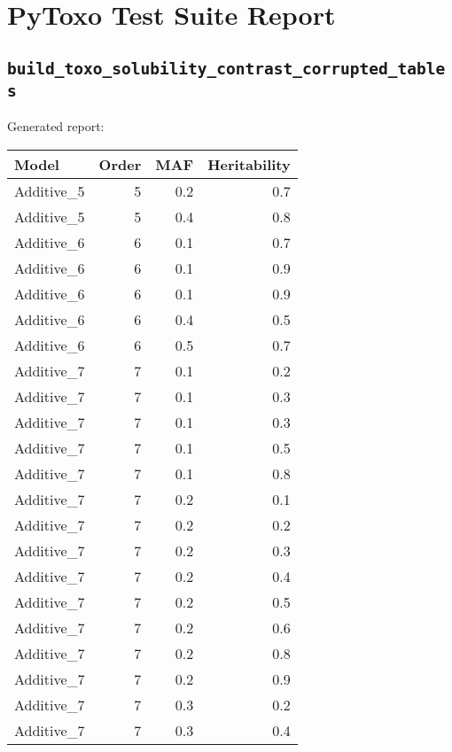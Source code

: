\documentclass{article}
\begin{document}
\section*{PyToxo Test Suite Report}
\subsection*{\texttt{build\_toxo\_solubility\_contrast\_corrupted\_tables}}
Generated report:

\begin{longtable}[H]{lrrr}
\hline
 Model      &   Order &   MAF &   Heritability \\
\hline
 Additive\_5 &       5 &   0.2 &            0.7 \\
 Additive\_5 &       5 &   0.4 &            0.8 \\
 Additive\_6 &       6 &   0.1 &            0.7 \\
 Additive\_6 &       6 &   0.1 &            0.9 \\
 Additive\_6 &       6 &   0.1 &            0.9 \\
 Additive\_6 &       6 &   0.4 &            0.5 \\
 Additive\_6 &       6 &   0.5 &            0.7 \\
 Additive\_7 &       7 &   0.1 &            0.2 \\
 Additive\_7 &       7 &   0.1 &            0.3 \\
 Additive\_7 &       7 &   0.1 &            0.3 \\
 Additive\_7 &       7 &   0.1 &            0.5 \\
 Additive\_7 &       7 &   0.1 &            0.8 \\
 Additive\_7 &       7 &   0.2 &            0.1 \\
 Additive\_7 &       7 &   0.2 &            0.2 \\
 Additive\_7 &       7 &   0.2 &            0.3 \\
 Additive\_7 &       7 &   0.2 &            0.4 \\
 Additive\_7 &       7 &   0.2 &            0.5 \\
 Additive\_7 &       7 &   0.2 &            0.6 \\
 Additive\_7 &       7 &   0.2 &            0.8 \\
 Additive\_7 &       7 &   0.2 &            0.9 \\
 Additive\_7 &       7 &   0.3 &            0.2 \\
 Additive\_7 &       7 &   0.3 &            0.4 \\

\end{longtable}
\end{document}
